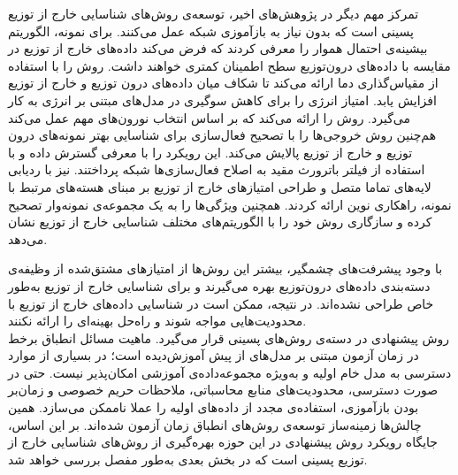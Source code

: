 
تمرکز مهم دیگر در پژوهش‌های اخیر، توسعه‌ی روش‌های {شناسایی خارج از توزیع پسینی} است که بدون نیاز به بازآموزی شبکه عمل می‌کنند.
برای نمونه، \cite{hendrycks2016baseline} {الگوریتم بیشینه‌ی احتمال هموار} را معرفی کردند
که فرض می‌کند داده‌های خارج از توزیع در مقایسه با داده‌های درون‌توزیع سطح اطمینان کمتری خواهند داشت. 
\cite{liang2018enhancing} روش  را با استفاده از {مقیاس‌گذاری دما} ارائه می‌کند
تا شکاف میان داده‌های درون توزیع و خارج از توزیع افزایش یابد.  
\cite{liu2020energy} امتیاز انرژی را برای کاهش سوگیری در مدل‌های مبتنی بر انرژی به کار می‌گیرد.  
\cite{sun2022dice} روش    را ارائه می‌کند که بر اساس انتخاب {نورون‌های} مهم عمل می‌کند 
هم‌چنین روش  \cite{sun2021react}  خروجی‌ها را با تصحیح فعال‌سازی برای شناسایی بهتر نمونه‌های درون توزیع و خارج از توزیع پالایش می‌کند.  
\cite{yuan2023lhact} این رویکرد را با معرفی   گسترش داده و 
با استفاده از فیلتر {باترورث‌} مقید به اصلاح فعال‌سازی‌ها شبکه پرداختند.  
\cite{tang2024cores} نیز با ردیابی لایه‌های {تماما متصل} و طراحی امتیازهای خارج از توزیع بر مبنای هسته‌های مرتبط با نمونه، 
راهکاری نوین ارائه کردند.  
همچنین \cite{zhu2022boosting} ویژگی‌ها را به یک مجموعه‌ی نمونه‌وار تصحیح کرده و 
سازگاری روش خود را با الگوریتم‌های مختلف شناسایی خارج از توزیع نشان می‌دهد. 

با وجود پیشرفت‌های چشمگیر، بیشتر این روش‌ها از امتیازهای مشتق‌شده از وظیفه‌ی دسته‌بندی داده‌های درون‌توزیع بهره می‌گیرند 
و برای شناسایی خارج از توزیع به‌طور خاص طراحی نشده‌اند. 
در نتیجه، ممکن است در شناسایی داده‌های خارج از توزیع با محدودیت‌هایی مواجه شوند و راه‌حل بهینه‌ای را ارائه نکنند.\\
روش پیشنهادی در دسته‌ی روش‌های پسینی قرار می‌گیرد. ماهیت مسائل انطباق برخط در زمان آزمون مبتنی بر مدل‌های از پیش آموزش‌دیده است؛ در بسیاری از موارد دسترسی به مدل خام اولیه و به‌ویژه مجموعه‌داده‌ی آموزشی امکان‌پذیر نیست. حتی در صورت دسترسی، محدودیت‌های منابع محاسباتی، ملاحظات حریم خصوصی و زمان‌بر بودن بازآموزی، استفاده‌ی مجدد از داده‌های اولیه را عملا ناممکن می‌سازد. همین چالش‌ها زمینه‌ساز توسعه‌ی روش‌های انطباق زمان آزمون شده‌اند. بر این اساس، جایگاه رویکرد روش پیشنهادی در این حوزه بهره‌گیری از روش‌های شناسایی خارج از توزیع پسینی است که در بخش بعدی به‌طور مفصل بررسی خواهد شد.

